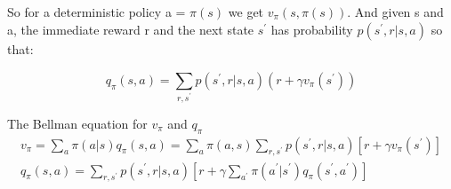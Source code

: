 So for a deterministic policy a = $\pi(s)$ we get $v_\pi(s,\pi(s))$. And given s and a, the immediate reward r and the next state $s^{\prime}$ has probability $p(s^{\prime}, r |s,a)$ so that:

	\begin{equation}
		q_\pi (s,a) = \sum_{r, s^{\prime}}^{} p(s^{\prime},r | s,a) (r + \gamma v_\pi(s^{\prime})) 		
	\end{equation} 


	\begin{wbox}{The Bellman equation for $v_\pi$ and $q_\pi$}
		\begin{equation}
		\begin{aligned}
			v_\pi = \sum_{a}^{} \pi(a |s)q_\pi(s,a) = \sum_{a}^{} \pi(a,s)\sum_{r, s^{\prime}}^{} p(s^{\prime}, r | s, a)[r + \gamma v_\pi(s^{\prime})] \\
			q_\pi(s,a) = \sum_{r, s^{\prime}}^{} p(s^{\prime},r |s,a) [r + \gamma \sum_{a^{\prime}}^{} \pi(a^{\prime} |s^{\prime})q_\pi(s^{\prime},a^{\prime})]
		\end{aligned} 
		\end{equation}
	\end{wbox}
	







